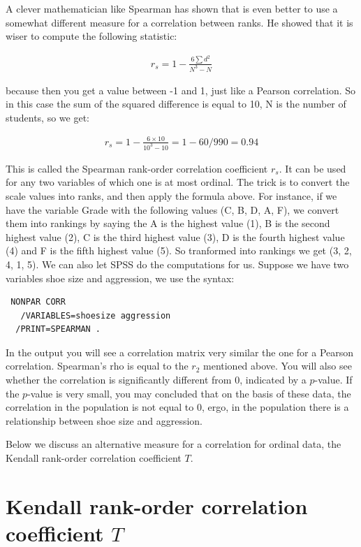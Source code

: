 \documentclass[]{report}\usepackage[]{graphicx}\usepackage[]{color}
\begin{document}
A clever mathematician like Spearman has shown that is even better to use a somewhat different measure for a correlation between ranks. He showed that it is wiser to compute the following statistic:

\begin{eqnarray}
r_s = 1 - \frac{6 \sum d^2 }{N^3-N}
\end{eqnarray}

because then you get a value between -1 and 1, just like a Pearson correlation. So in this case the sum of the squared difference is equal to 10, N is the number of students, so we get:


\begin{eqnarray}
r_s = 1 - \frac{6 \times 10  }{10^3-10} = 1 - 60 /990 = 0.94
\end{eqnarray}


 This is called the Spearman rank-order correlation coefficient $r_s$. It can be used for any two variables of which one is at most ordinal. The trick is to convert the scale values into ranks, and then apply the formula above. For instance, if we have the variable Grade with the following values (C, B, D, A, F), we convert them into rankings by saying the A is the highest value (1), B is the second highest value (2), C is the third highest value (3), D is the fourth highest value (4) and F is the fifth highest value (5). So tranformed into rankings we get (3, 2, 4, 1, 5). We can also let SPSS do the computations for us. Suppose we have two variables shoe size and aggression, we use the syntax:
 \begin{verbatim}
 NONPAR CORR 
   /VARIABLES=shoesize aggression 
  /PRINT=SPEARMAN .
 \end{verbatim}
  
In the output you will see a correlation matrix very similar the one for a Pearson correlation. Spearman's rho is equal to the $r_2$ mentioned above. You will also see whether the correlation is significantly different from 0, indicated by a $p$-value. If the $p$-value is very small, you may concluded that on the basis of these data, the correlation in the population is not equal to 0, ergo, in the population there is a relationship between shoe size and aggression.   
  

Below we discuss an alternative measure for a correlation for ordinal data, the Kendall rank-order correlation coefficient $T$. 


\section{Kendall rank-order correlation coefficient $T$}
\end{document}
